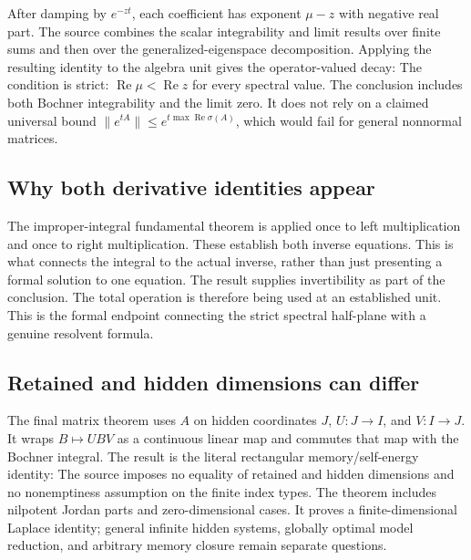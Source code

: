 After damping by $e^{-zt}$, each coefficient has exponent $\mu-z$ with negative real part. The source combines the scalar integrability and limit results over finite sums and then over the generalized-eigenspace decomposition. Applying the resulting identity to the algebra unit gives the operator-valued decay:
The condition is strict: $\operatorname{Re}\mu<\operatorname{Re}z$ for every spectral value. The conclusion includes both Bochner integrability and the limit zero. It does not rely on a claimed universal bound $\|e^{tA}\|\le e^{t\max\operatorname{Re}\sigma(A)}$, which would fail for general nonnormal matrices.

\subsection{Why both derivative identities appear}
The improper-integral fundamental theorem is applied once to left multiplication and once to right multiplication. These establish both inverse equations. This is what connects the integral to the actual inverse, rather than just presenting a formal solution to one equation.
The result supplies invertibility as part of the conclusion. The total operation  is therefore being used at an established unit. This is the formal endpoint connecting the strict spectral half-plane with a genuine resolvent formula.

\subsection{Retained and hidden dimensions can differ}
The final matrix theorem uses $A$ on hidden coordinates $J$, $U:J\to I$, and $V:I\to J$. It wraps $B\mapsto UBV$ as a continuous linear map and commutes that map with the Bochner integral. The result is the literal rectangular memory/self-energy identity:
The source imposes no equality of retained and hidden dimensions and no nonemptiness assumption on the finite index types. The theorem includes nilpotent Jordan parts and zero-dimensional cases. It proves a finite-dimensional Laplace identity; general infinite hidden systems, globally optimal model reduction, and arbitrary memory closure remain separate questions.
